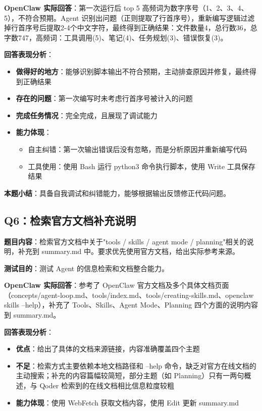 \documentclass[a4paper]{article}
\begin{document}
\textbf{OpenClaw 实际回答}：第一次运行后 top 5 高频词为数字序号（1、2、3、4、5），不符合预期。Agent 识别出问题（正则提取了行首序号），重新编写逻辑过滤掉行首序号后提取2-4个中文字符，最终得到正确结果：文件数量4，总行数36，总字数747，高频词：工具调用(5)、笔记(4)、任务规划(3)、错误恢复(3)。

\textbf{回答表现分析}：

\begin{itemize}
    \item \textbf{做得好的地方}：能够识别脚本输出不符合预期，主动排查原因并修复，最终得到正确结果
    \item \textbf{存在的问题}：第一次编写时未考虑行首序号被计入的问题
    \item \textbf{完成任务情况}：完全完成，且展现了调试能力
    \item \textbf{能力体现}：
    \begin{itemize}
        \item 自主纠错：第一次输出错误后没有忽略，而是分析原因并重新编写代码
        \item 工具使用：使用 Bash 运行 python3 命令执行脚本，使用 Write 工具保存结果
    \end{itemize}
\end{itemize}

\textbf{本题小结}：具备自我调试和纠错能力，能够根据输出反馈修正代码问题。

\subsection*{Q6：检索官方文档补充说明}

\textbf{题目内容}：检索官方文档中关于"tools / skills / agent mode / planning"相关的说明，补充到 summary.md 中。要求优先使用官方文档，给出实际参考来源。

\textbf{测试目的}：测试 Agent 的信息检索和文档整合能力。

\textbf{OpenClaw 实际回答}：参考了 OpenClaw 官方文档及多个具体文档页面（concepts/agent-loop.md、tools/index.md、tools/creating-skills.md、openclaw skills --help），补充了 Tools、Skills、Agent Mode、Planning 四个方面的说明内容到 summary.md。

\textbf{回答表现分析}：

\begin{itemize}
    \item \textbf{优点}：给出了具体的文档来源链接，内容准确覆盖四个主题
    \item \textbf{不足}：检索方式主要依赖本地文档路径和 --help 命令，缺乏对官方在线文档的主动搜索；补充的内容篇幅较简短，部分主题（如 Planning）只有一两句概述，与 Qoder 检索到的在线文档相比信息粒度较粗
    \item \textbf{能力体现}：使用 WebFetch 获取文档内容，使用 Edit 更新 summary.md
\end{itemize}
\end{document}
